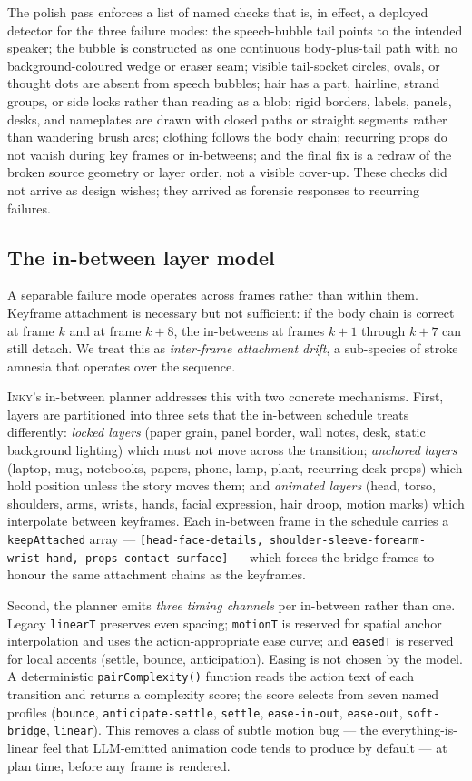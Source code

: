 \documentclass[10pt,twocolumn]{article}
\newcommand{\inky}{\textsc{Inky}}
\begin{document}
The polish pass enforces a list of named checks that is, in
effect, a deployed detector for the three failure modes: the
speech-bubble tail points to the intended speaker; the bubble is
constructed as one continuous body-plus-tail path with no
background-coloured wedge or eraser seam; visible tail-socket
circles, ovals, or thought dots are absent from speech bubbles;
hair has a part, hairline, strand groups, or side locks rather
than reading as a blob; rigid borders, labels, panels, desks, and
nameplates are drawn with closed paths or straight segments rather
than wandering brush arcs; clothing follows the body chain;
recurring props do not vanish during key frames or in-betweens;
and the final fix is a redraw of the broken source geometry or
layer order, not a visible cover-up. These checks did not arrive
as design wishes; they arrived as forensic responses to recurring
failures.

\subsection{The in-between layer model}

A separable failure mode operates across frames rather than within
them. Keyframe attachment is necessary but not sufficient: if the
body chain is correct at frame $k$ and at frame $k+8$, the
in-betweens at frames $k+1$ through $k+7$ can still detach. We
treat this as \emph{inter-frame attachment drift}, a sub-species
of stroke amnesia that operates over the sequence.

\inky{}'s in-between planner addresses this with two concrete
mechanisms. First, layers are partitioned into three sets that
the in-between schedule treats differently: \emph{locked layers}
(paper grain, panel border, wall notes, desk, static background
lighting) which must not move across the transition;
\emph{anchored layers} (laptop, mug, notebooks, papers, phone,
lamp, plant, recurring desk props) which hold position unless
the story moves them; and \emph{animated layers} (head, torso,
shoulders, arms, wrists, hands, facial expression, hair droop,
motion marks) which interpolate between keyframes. Each
in-between frame in the schedule carries a \texttt{keepAttached}
array --- \texttt{[head-face-details, shoulder-sleeve-forearm-%
wrist-hand, props-contact-surface]} --- which forces the bridge
frames to honour the same attachment chains as the keyframes.

Second, the planner emits \emph{three timing channels} per
in-between rather than one. Legacy \texttt{linearT} preserves
even spacing; \texttt{motionT} is reserved for spatial anchor
interpolation and uses the action-appropriate ease curve; and
\texttt{easedT} is reserved for local accents (settle, bounce,
anticipation). Easing is not chosen by the model. A
deterministic \texttt{pairComplexity()} function reads the
action text of each transition and returns a complexity score;
the score selects from seven named profiles (\texttt{bounce},
\texttt{anticipate-settle}, \texttt{settle},
\texttt{ease-in-out}, \texttt{ease-out},
\texttt{soft-bridge}, \texttt{linear}). This removes a class
of subtle motion bug --- the everything-is-linear feel that
LLM-emitted animation code tends to produce by default --- at
plan time, before any frame is rendered.
\end{document}
